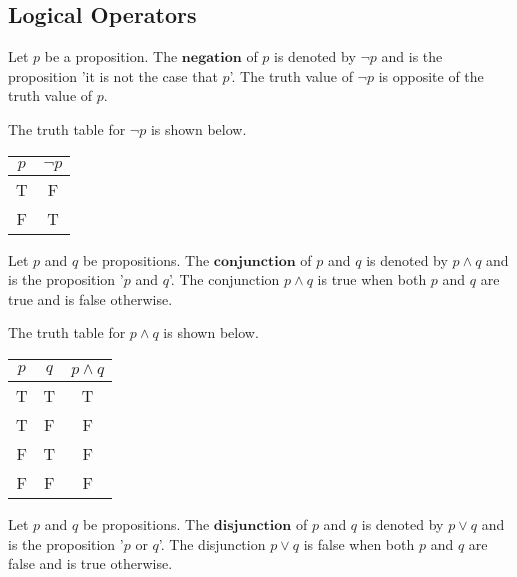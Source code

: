 \documentclass{article}
\newtheorem{definition}{Definition}[subsection]
\begin{document}
\subsection{Logical Operators}
\begin{tcolorbox}
[colback=blue!5!white,colframe=blue!75!black,title=\begin{definition}
\end{definition}]
Let $p$ be a proposition. The $\textbf{negation}$ of $p$ is denoted by $\neg p$ and is the proposition 'it is not the case that $p$'. The truth value of $\neg p$ is opposite of the truth value of $p$.
\end{tcolorbox}
The truth table for $\neg p$ is shown below.
\begin{table}[h]
    \centering
    \begin{tabular}{|c|c|}
        \hline
        $p$ & $\neg p$ \\ \hline
        T & F\\ \hline
        F & T\\ \hline
    \end{tabular}
\end{table}
\begin{tcolorbox}
[colback=blue!5!white,colframe=blue!75!black,title=\begin{definition}
\end{definition}]
Let $p$ and $q$ be propositions. The $\textbf{conjunction}$ of $p$ and $q$ is denoted by $p\wedge q$ and is the proposition '$p$ and $q$'. The conjunction $p \wedge q$ is true when both $p$ and $q$ are true and is false otherwise.
\end{tcolorbox}
The truth table for $p \wedge q$ is shown below.
\begin{table}[h]
    \centering
    \begin{tabular}{|c|c|c|}
    \hline
     $p$ & $q$& $p \wedge q$\\ \hline
     T  & T & T\\ \hline
     T & F &F\\ \hline
     F&T&F\\ \hline
     F&F&F\\ \hline
    \end{tabular}
\end{table}
\begin{tcolorbox}
[colback=blue!5!white,colframe=blue!75!black,title=\begin{definition}
\end{definition}]   
Let $p$ and $q$ be propositions. The $\textbf{disjunction}$ of $p$ and $q$ is denoted by $p \lor q $ and is the proposition '$p$ or $q$'. The disjunction $p \lor q$ is false when both $p$ and $q$ are false and is true otherwise.
\end{tcolorbox}
\end{document}
